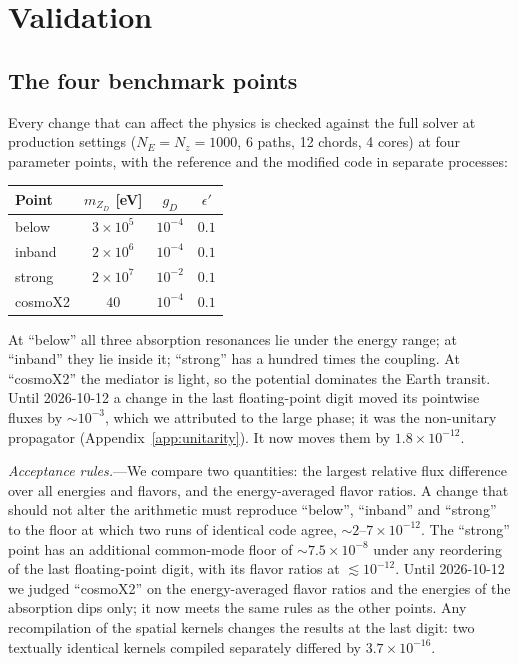 \documentclass[11pt,a4paper]{article}
\newcommand{\mzd}{m_{Z_D}}
\newcommand{\gd}{g_D}
\newcommand{\epsp}{\epsilon'}
\begin{document}
\section{Validation}
\label{sec:validation}

\subsection{The four benchmark points}

Every change that can affect the physics is checked against the full solver at production
settings ($N_E = N_z = 1000$, 6 paths, 12 chords, 4 cores) at four parameter points, with the
reference and the modified code in separate processes:
\begin{center}
\small
\begin{tabular}{lccc}
\toprule
Point & $\mzd$ [eV] & $\gd$ & $\epsp$ \\
\midrule
below & $3\times10^{5}$ & $10^{-4}$ & $0.1$ \\
inband & $2\times10^{6}$ & $10^{-4}$ & $0.1$ \\
strong & $2\times10^{7}$ & $10^{-2}$ & $0.1$ \\
cosmoX2 & $40$ & $10^{-4}$ & $0.1$ \\
\bottomrule
\end{tabular}
\end{center}
At ``below'' all three absorption resonances lie under the energy range; at ``inband'' they lie
inside it; ``strong'' has a hundred times the coupling. At ``cosmoX2'' the mediator is light, so
the potential dominates the Earth transit. Until 2026-10-12 a change in the last floating-point
digit moved its pointwise fluxes by $\sim10^{-3}$, which we attributed to the large phase; it was
the non-unitary propagator (Appendix~\ref{app:unitarity}). It now moves them by
$1.8\times10^{-12}$.

\textit{Acceptance rules.}---We compare two quantities: the largest relative flux difference over
all energies and flavors, and the energy-averaged flavor ratios. A change that should not alter the
arithmetic must reproduce ``below'', ``inband'' and ``strong'' to the floor at which two runs of
identical code agree, $\sim2$--$7\times10^{-12}$. The ``strong'' point has an additional
common-mode floor of $\sim7.5\times10^{-8}$ under any reordering of the last floating-point digit, with its
flavor ratios at $\lesssim10^{-12}$. Until 2026-10-12 we judged ``cosmoX2'' on the energy-averaged
flavor ratios and the energies of the absorption dips only; it now meets the same rules as the
other points. Any recompilation of the spatial kernels changes the results at the last digit:
two textually identical kernels compiled separately differed by $3.7\times10^{-16}$.
\end{document}

